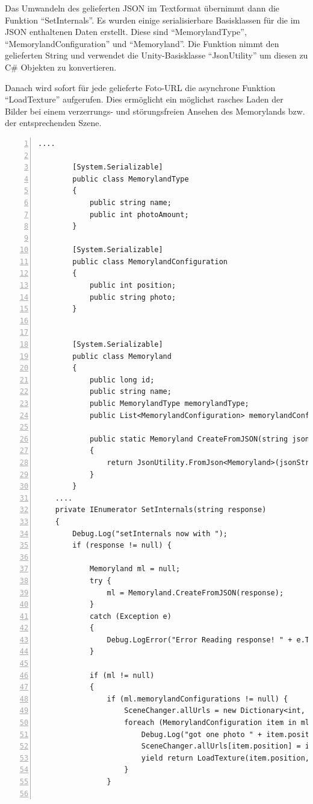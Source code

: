 Das Umwandeln des gelieferten JSON im Textformat übernimmt dann die Funktion ``SetInternals''. Es wurden einige serialisierbare Basisklassen für die im JSON enthaltenen Daten erstellt. Diese sind ``MemorylandType'', ``MemorylandConfiguration'' und ``Memoryland''. Die Funktion nimmt den gelieferten String und verwendet die Unity-Basisklasse ``JsonUtility'' um diesen zu C\# Objekten zu konvertieren.

Danach wird sofort für jede gelieferte Foto-URL die asynchrone Funktion ``LoadTexture'' aufgerufen. Dies ermöglicht ein möglichst rasches Laden der Bilder bei einem verzerrungs- und störungsfreien Ansehen des Memorylands bzw. der entsprechenden Szene. 

\begin{lstlisting}[numbers=left,caption={SceneChanger - SetInternals},label={lst:unity-scene-changer-set-internals}]
    ....   
    
        [System.Serializable]
        public class MemorylandType
        {
            public string name;
            public int photoAmount;
        }
        
        [System.Serializable]
        public class MemorylandConfiguration
        {
            public int position;
            public string photo;
        }
        
        
        [System.Serializable]
        public class Memoryland
        {
            public long id;
            public string name;
            public MemorylandType memorylandType;
            public List<MemorylandConfiguration> memorylandConfigurations;
        
            public static Memoryland CreateFromJSON(string jsonString)
            {
                return JsonUtility.FromJson<Memoryland>(jsonString);
            }
        }
    ....
    private IEnumerator SetInternals(string response) 
    {
        Debug.Log("setInternals now with ");
        if (response != null) {
        
            Memoryland ml = null;
            try {
                ml = Memoryland.CreateFromJSON(response);
            }
            catch (Exception e)
            {
                Debug.LogError("Error Reading response! " + e.ToString());
            }
            
            if (ml != null) 
            {
                if (ml.memorylandConfigurations != null) {
                    SceneChanger.allUrls = new Dictionary<int, string>();
                    foreach (MemorylandConfiguration item in ml.memorylandConfigurations) {
                        Debug.Log("got one photo " + item.position.ToString());
                        SceneChanger.allUrls[item.position] = item.photo;
                        yield return LoadTexture(item.position, item.photo);
                    }
                }


\end{lstlisting}
